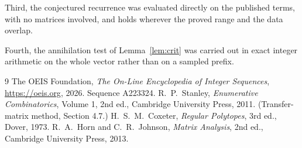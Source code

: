 \documentclass[11pt,a4paper]{article}
\theoremstyle{plain}
\theoremstyle{definition}
\begin{document}
Third, the conjectured recurrence was evaluated directly on the published terms, with no
matrices involved, and holds wherever the proved range and the data overlap.

Fourth, the annihilation test of Lemma~\ref{lem:crit} was carried out in exact integer
arithmetic on the whole vector rather than on a sampled prefix.

\begin{thebibliography}{9}
 The OEIS Foundation, \emph{The On-Line Encyclopedia of Integer
Sequences}, \url{https://oeis.org}, 2026. Sequence A223324.
 R.~P.~Stanley, \emph{Enumerative Combinatorics}, Volume 1, 2nd ed.,
Cambridge University Press, 2011. (Transfer-matrix method, Section 4.7.)
 H.~S.~M.~Coxeter, \emph{Regular Polytopes}, 3rd ed., Dover, 1973.
 R.~A.~Horn and C.~R.~Johnson, \emph{Matrix Analysis}, 2nd ed., Cambridge
University Press, 2013.
\end{thebibliography}
\end{document}
